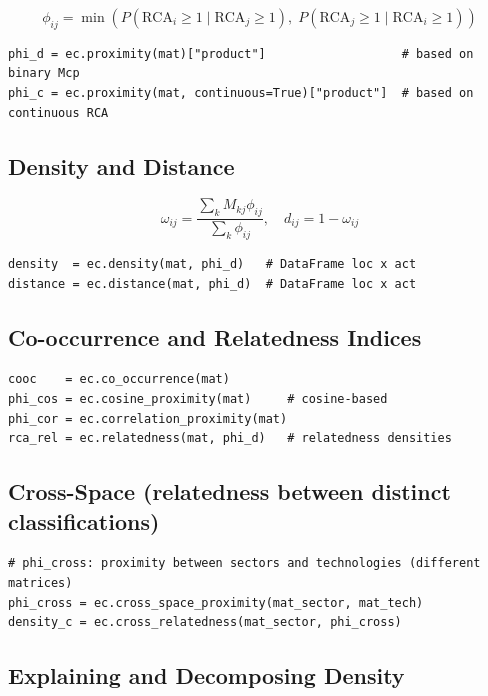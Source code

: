 \documentclass[12pt, a4paper]{article}
\begin{document}
\[
  \phi_{ij} = \min\!\left(
    P(\text{RCA}_i \geq 1 \mid \text{RCA}_j \geq 1),\;
    P(\text{RCA}_j \geq 1 \mid \text{RCA}_i \geq 1)
  \right)
\]

\begin{lstlisting}[caption={Discrete and continuous proximity}]
phi_d = ec.proximity(mat)["product"]                   # based on binary Mcp
phi_c = ec.proximity(mat, continuous=True)["product"]  # based on continuous RCA
\end{lstlisting}

\subsection{Density and Distance}

\[
  \omega_{ij} = \frac{\sum_k M_{kj} \phi_{ij}}{\sum_k \phi_{ij}}, \quad
  d_{ij} = 1 - \omega_{ij}
\]

\begin{lstlisting}[caption={Density and distance}]
density  = ec.density(mat, phi_d)   # DataFrame loc x act
distance = ec.distance(mat, phi_d)  # DataFrame loc x act
\end{lstlisting}

\subsection{Co-occurrence and Relatedness Indices}

\begin{lstlisting}[caption={Co-occurrence and relatedness indices}]
cooc    = ec.co_occurrence(mat)
phi_cos = ec.cosine_proximity(mat)     # cosine-based
phi_cor = ec.correlation_proximity(mat)
rca_rel = ec.relatedness(mat, phi_d)   # relatedness densities
\end{lstlisting}

\subsection{Cross-Space (relatedness between distinct classifications)}

\begin{lstlisting}[caption={Cross-space proximity and relatedness}]
# phi_cross: proximity between sectors and technologies (different matrices)
phi_cross = ec.cross_space_proximity(mat_sector, mat_tech)
density_c = ec.cross_relatedness(mat_sector, phi_cross)
\end{lstlisting}

\subsection{Explaining and Decomposing Density}
\end{document}
